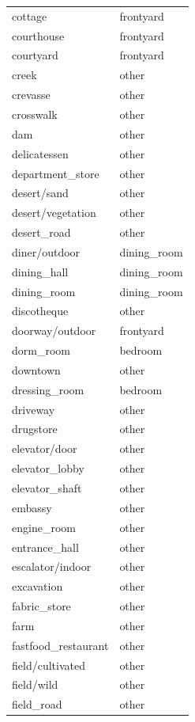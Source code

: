 \begin{table}[h!]
\begin{tabular}{| l | l |}
		cottage &    frontyard \\
		courthouse &    frontyard \\
		courtyard &    frontyard \\
		creek &        other \\
		crevasse &        other \\
		crosswalk &        other \\
		dam &        other \\
		delicatessen &        other \\
		department\_store &        other \\
		desert/sand &        other \\
		desert/vegetation &        other \\
		desert\_road &        other \\
		diner/outdoor &  dining\_room \\
		dining\_hall &  dining\_room \\
		dining\_room &  dining\_room \\
		discotheque &        other \\
		doorway/outdoor &    frontyard \\
		dorm\_room &      bedroom \\
		downtown &        other \\
		dressing\_room &      bedroom \\
		driveway &        other \\
		drugstore &        other \\
		elevator/door &        other \\
		elevator\_lobby &        other \\
		elevator\_shaft &        other \\
		embassy &        other \\
		engine\_room &        other \\
		entrance\_hall &        other \\
		escalator/indoor &        other \\
		excavation &        other \\
		fabric\_store &        other \\
		farm &        other \\
		fastfood\_restaurant &        other \\
		field/cultivated &        other \\
		field/wild &        other \\
		field\_road &        other \\

\end{tabular}
\end{table}

